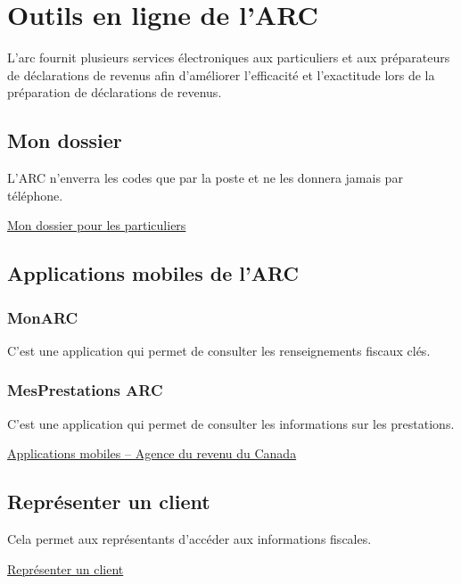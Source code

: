 \section{Outils en ligne de l'ARC}
\begin{intro}
	L'\acrshort{arc} fournit plusieurs services électroniques aux particuliers et aux préparateurs de déclarations de revenus afin d'améliorer l'efficacité et l'exactitude lors de la préparation de déclarations de revenus.
\end{intro}


\subsection{Mon dossier}
\begin{note}
	L'ARC n'enverra les codes que par la poste et ne les donnera jamais par téléphone.
\end{note}
\href{https://www.canada.ca/fr/agence-revenu/services/services-electroniques/services-numeriques-particuliers/dossier-particuliers.html}{Mon dossier pour les particuliers}


\subsection{Applications mobiles de l'ARC}
\subsubsection{MonARC}
C'est une application qui permet de consulter les renseignements fiscaux clés.

\subsubsection{MesPrestations ARC}
C'est une application qui permet de consulter les informations sur les prestations.

\href{https://www.canada.ca/fr/agence-revenu/services/services-electroniques/applications-mobiles-arc.html}{Applications mobiles – Agence du revenu du Canada}


\subsection{Représenter un client}
Cela permet aux représentants d'accéder aux informations fiscales.

\href{https://www.canada.ca/fr/agence-revenu/services/services-electroniques/representer-client.html}{Représenter un client}



